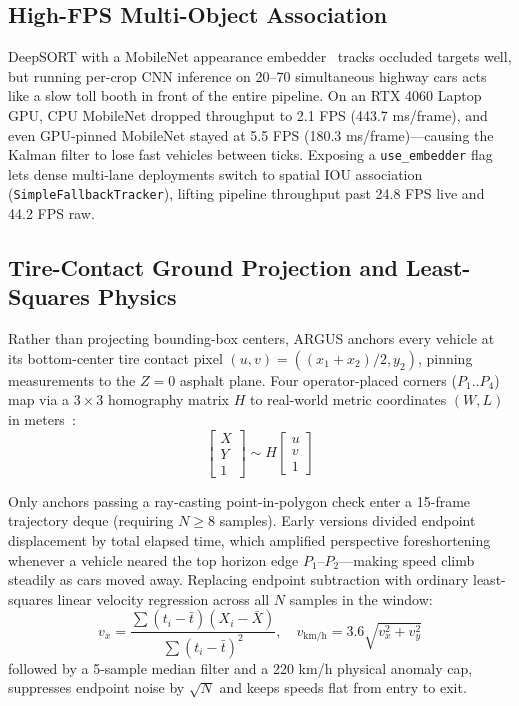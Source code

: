 \documentclass[conference]{IEEEtran}
\begin{document}
\subsection{High-FPS Multi-Object Association}
DeepSORT with a MobileNet appearance embedder~\cite{wojke2017deepsort} tracks occluded targets well, but running per-crop CNN inference on 20--70 simultaneous highway cars acts like a slow toll booth in front of the entire pipeline. On an RTX 4060 Laptop GPU, CPU MobileNet dropped throughput to 2.1 FPS (443.7 ms/frame), and even GPU-pinned MobileNet stayed at 5.5 FPS (180.3 ms/frame)---causing the Kalman filter to lose fast vehicles between ticks. Exposing a \texttt{use\_embedder} flag lets dense multi-lane deployments switch to spatial IOU association (\texttt{SimpleFallbackTracker}), lifting pipeline throughput past 24.8 FPS live and 44.2 FPS raw.

\subsection{Tire-Contact Ground Projection and Least-Squares Physics}
Rather than projecting bounding-box centers, ARGUS anchors every vehicle at its bottom-center tire contact pixel $(u, v) = ((x_1 + x_2)/2, y_2)$, pinning measurements to the $Z=0$ asphalt plane. Four operator-placed corners ($P_1..P_4$) map via a $3\times 3$ homography matrix $H$ to real-world metric coordinates $(W, L)$ in meters~\cite{hartley2003multiple}:
\begin{equation}
\begin{bmatrix} X \\ Y \\ 1 \end{bmatrix} \sim H \begin{bmatrix} u \\ v \\ 1 \end{bmatrix}
\end{equation}

Only anchors passing a ray-casting point-in-polygon check enter a 15-frame trajectory deque (requiring $N \ge 8$ samples). Early versions divided endpoint displacement by total elapsed time, which amplified perspective foreshortening whenever a vehicle neared the top horizon edge $P_1$--$P_2$---making speed climb steadily as cars moved away. Replacing endpoint subtraction with ordinary least-squares linear velocity regression across all $N$ samples in the window:
\begin{equation}
v_x = \frac{\sum (t_i - \bar{t})(X_i - \bar{X})}{\sum (t_i - \bar{t})^2}, \quad
v_{\text{km/h}} = 3.6 \sqrt{v_x^2 + v_y^2}
\end{equation}
followed by a 5-sample median filter and a 220 km/h physical anomaly cap, suppresses endpoint noise by $\sqrt{N}$ and keeps speeds flat from entry to exit.
\end{document}
